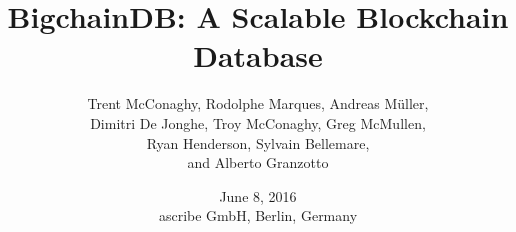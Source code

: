 \documentclass[a4paper]{scrartcl}
\title{\LARGE BigchainDB: A Scalable Blockchain Database}
\author{
  Trent McConaghy, 
  Rodolphe Marques,
  Andreas M\"{u}ller,\\
  Dimitri De Jonghe,
  Troy McConaghy,
  Greg McMullen,\\
  Ryan Henderson,
  Sylvain Bellemare,\\
  and
  Alberto Granzotto
}
\date{\normalsize June 8, 2016\\ascribe GmbH, Berlin, Germany}
\begin{document}
\maketitle















\begin{appendices}




\end{appendices}

{\footnotesize{}}

\end{document}
